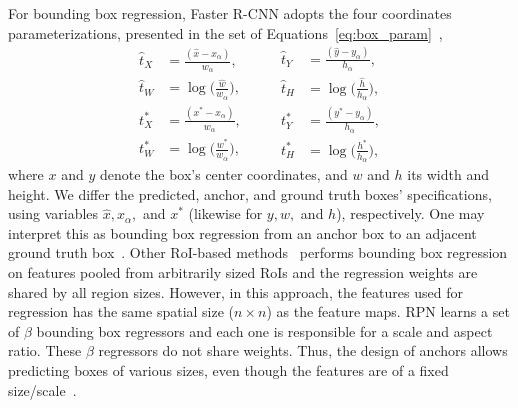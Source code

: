 For bounding box regression, Faster R-CNN adopts the four coordinates parameterizations, presented in the set of Equations~\eqref{eq:box_param}~\cite{Ren2017fasterpami},
%
\begin{equation}
  \begin{aligned}
  \hat t_{X} &= \frac{(\hat x-x_{\alpha})}{w_{\alpha}},\\
  \hat t_{W} &= \log\bigg(\frac{\hat w}{w_{\alpha}}\bigg),\\
  t_{X}^* &= \frac{(x^*-x_{\alpha})}{w_{\alpha}},\\
  t_{W}^* &= \log\bigg(\frac{w^*}{w_{\alpha}}\bigg),
  \end{aligned}
\qquad
   \begin{aligned}
  \hat t_{Y} &= \frac{(\hat y-y_{\alpha})}{h_{\alpha}},\\
  \hat t_{H} &= \log\bigg(\frac{\hat h}{h_{\alpha}}\bigg),\\
  t_{Y}^* &= \frac{(y^*-y_{\alpha})}{h_{\alpha}},\\
  t_{H}^* &= \log\bigg(\frac{h^*}{h_{\alpha}}\bigg),
  \end{aligned}
  \label{eq:box_param}
\end{equation}
%
where $x$ and $y$ denote the box's center coordinates, and $w$ and $h$ its width and height.
We differ the predicted, anchor, and ground truth boxes' specifications, using variables $\hat x, x_{\alpha},$ and $x^*$ (likewise for $y, w,$ and $h$), respectively.
One may interpret this as bounding box regression from an anchor box to an adjacent ground truth box~\cite{Ren2017fasterpami}.
Other RoI-based methods~\cite{Girshick2015} performs bounding box regression on features pooled from arbitrarily sized RoIs and the regression weights are shared by all region sizes.
However, in this approach, the features used for regression has the same spatial size ($n\times n$) as the feature maps.
RPN learns a set of $\beta$ bounding box regressors and each one is responsible for a scale and aspect ratio.
These $\beta$ regressors do not share weights.
Thus, the design of anchors allows predicting boxes of various sizes, even though the features are of a fixed size/scale~\cite{Ren2017fasterpami}.

